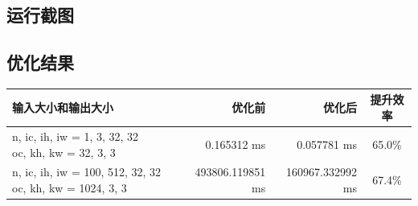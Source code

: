 \documentclass[UTF8]{ctexart}
\begin{document}
\subsection*{运行截图}
\begin{figure}[H]
    \centering
\end{figure}

\subsection*{优化结果}
\begin{table}[H]
    \begin{tabular}{m{17em}rrc}
        \toprule
        输入大小和输出大小 & 优化前 & 优化后 & 提升效率 \\
        \midrule
        \ttfamily
        n, ic, ih, iw = 1, 3, 32, 32~~~~~
        oc, kh, kw = 32, 3, 3
        & 0.165312 ms & 0.057781 ms & 65.0\%\\
        \hline
        \ttfamily
        n, ic, ih, iw = 100, 512, 32, 32
        oc, kh, kw = 1024, 3, 3
        & 493806.119851 ms & 160967.332992 ms & 67.4\%\\
        \bottomrule
    \end{tabular}
\end{table}
\end{document}
